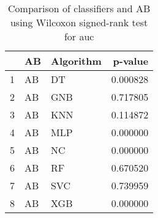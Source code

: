 \begin{table}
\footnotesize
\caption{Comparison of classifiers and AB using Wilcoxon signed-rank test for auc}
\label{tab:AB wilcoxon AUC comparison}
\begin{tabular}{lllr}
\hline
 & AB & Algorithm & p-value \\
\hline
1 & AB & DT & 0.000828 \\
2 & AB & GNB & 0.717805 \\
3 & AB & KNN & 0.114872 \\
4 & AB & MLP & 0.000000 \\
5 & AB & NC & 0.000000 \\
6 & AB & RF & 0.670520 \\
7 & AB & SVC & 0.739959 \\
8 & AB & XGB & 0.000000 \\
\hline
\end{tabular}
\end{table}
